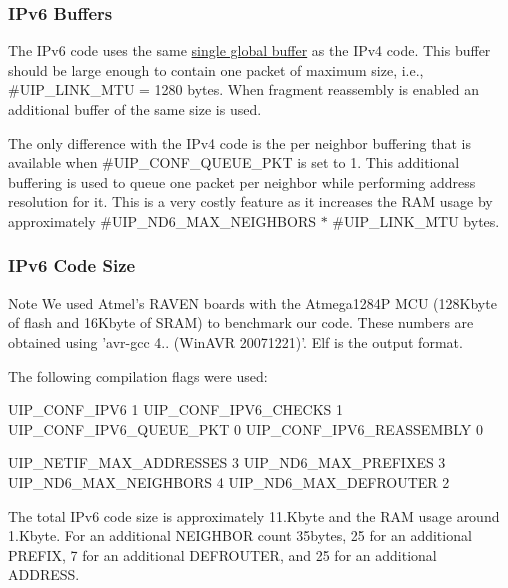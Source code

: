 \hypertarget{a00061_buffers}{}\subsubsection{\-I\-Pv6 Buffers}\label{a00061_buffers}
\-The \-I\-Pv6 code uses the same \hyperlink{a00060_memory}{single global buffer} as the \-I\-Pv4 code. \-This buffer should be large enough to contain one packet of maximum size, i.\-e., \#\-U\-I\-P\-\_\-\-L\-I\-N\-K\-\_\-\-M\-T\-U = 1280 bytes. \-When fragment reassembly is enabled an additional buffer of the same size is used.

\-The only difference with the \-I\-Pv4 code is the per neighbor buffering that is available when \#\-U\-I\-P\-\_\-\-C\-O\-N\-F\-\_\-\-Q\-U\-E\-U\-E\-\_\-\-P\-K\-T is set to 1. \-This additional buffering is used to queue one packet per neighbor while performing address resolution for it. \-This is a very costly feature as it increases the \-R\-A\-M usage by approximately \#\-U\-I\-P\-\_\-\-N\-D6\-\_\-\-M\-A\-X\-\_\-\-N\-E\-I\-G\-H\-B\-O\-R\-S $\ast$ \#\-U\-I\-P\-\_\-\-L\-I\-N\-K\-\_\-\-M\-T\-U bytes.



\hypertarget{a00061_size}{}\subsubsection{\-I\-Pv6 Code Size}\label{a00061_size}
\begin{DoxyNote}{\-Note}
\-We used \-Atmel's \-R\-A\-V\-E\-N boards with the \-Atmega1284\-P \-M\-C\-U (128\-Kbyte of flash and 16\-Kbyte of \-S\-R\-A\-M) to benchmark our code. \-These numbers are obtained using 'avr-\/gcc 4.. (\-Win\-A\-V\-R 20071221)'. \-Elf is the output format.

\-The following compilation flags were used\-: 
\begin{DoxyCode}
UIP_CONF_IPV6            1      
UIP_CONF_IPV6_CHECKS     1      
UIP_CONF_IPV6_QUEUE_PKT  0      
UIP_CONF_IPV6_REASSEMBLY 0      

UIP_NETIF_MAX_ADDRESSES 3
UIP_ND6_MAX_PREFIXES    3
UIP_ND6_MAX_NEIGHBORS   4
UIP_ND6_MAX_DEFROUTER   2
\end{DoxyCode}

\end{DoxyNote}
\-The total \-I\-Pv6 code size is approximately 11.\-Kbyte and the \-R\-A\-M usage around 1.\-Kbyte. \-For an additional \-N\-E\-I\-G\-H\-B\-O\-R count 35bytes, 25 for an additional \-P\-R\-E\-F\-I\-X, 7 for an additional \-D\-E\-F\-R\-O\-U\-T\-E\-R, and 25 for an additional \-A\-D\-D\-R\-E\-S\-S.



